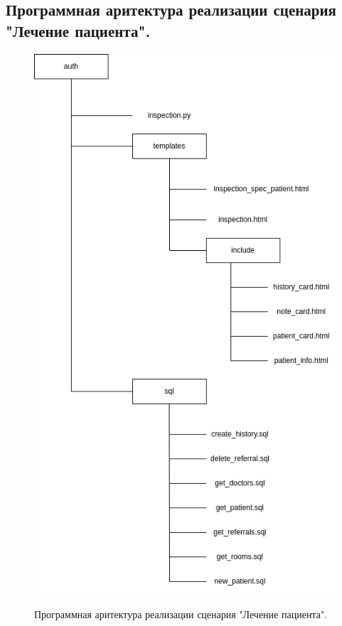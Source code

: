 \documentclass[12pt, a4paper]{article}
\begin{document}
    \subsection{Программная аритектура реализации сценария "Лечение пациента".}
    \begin{figure}[h]
    	\centering    %
    	\includegraphics[height=0.7\textheight]{pictures/archTreatment.png}
    	\label{fig:pic12} %
    	\caption{Программная аритектура реализации сценария "Лечение пациента".}
    \end{figure}
\end{document}
